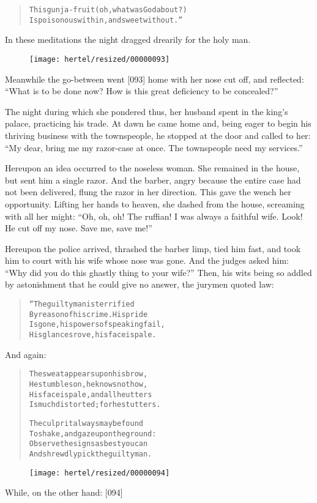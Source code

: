 \documentclass[article, twoside, 10pt]{memoir}
\renewenvironment{verbatim}{%
\begin{quote}%
\vskip -10pt%
\begin{alltt}\normalfont\small}{\end{alltt}%
\end{quote}%
\vskip -10pt
} %
\begin{document}
\begin{verbatim}
This gunja-fruit (oh, what was God about?)
Is poisonous within, and sweet without.”
\end{verbatim}
In these meditations the night dragged drearily for the holy man.
\begin{figure}[p]\texttt{[image: hertel/resized/00000093]}\end{figure}Meanwhile the go-between went [093] home with her nose cut off, and
reflected:
``What is to be done now? How is this great deficiency to be concealed?''

The night during which she pondered thus, her husband spent in the
king's palace, practicing his trade. At dawn he came home and,
being eager to begin his thriving business with the townspeople, he
stopped at the door and called to her:
``My dear, bring me my razor-case at once. The townspeople need my services.''

Hereupon an idea occurred to the noseless woman. She remained in
the house, but sent him a single razor. And the barber, angry
because the entire case had not been delivered, flung the razor in
her direction. This gave the wench her opportunity. Lifting her
hands to heaven, she dashed from the house, screaming with all her
might:
``Oh, oh, oh! The ruffian! I was always a faithful wife. Look! He cut off my nose. Save me, save me!''

Hereupon the police arrived, thrashed the barber limp, tied him
fast, and took him to court with his wife whose nose was gone. And
the judges asked him:
``Why did you do this ghastly thing to your wife?'' Then, his wits
being so addled by astonishment that he could give no answer, the
jurymen quoted law:

\begin{verbatim}
“The guilty man is terrified
By reason of his crime. His pride
Is gone, his powers of speaking fail,
His glances rove, his face is pale.
\end{verbatim}
And again:

\begin{verbatim}
The sweat appears upon his brow,
He stumbles on, he knows not how,
His face is pale, and all he utters
Is much distorted; for he stutters.

The culprit always may be found
To shake, and gaze upon the ground:
Observe the signs as best you can
And shrewdly pick the guilty man.
\end{verbatim}
\begin{figure}[p]\texttt{[image: hertel/resized/00000094]}\end{figure}While, on the other hand: [094]
\end{document}

